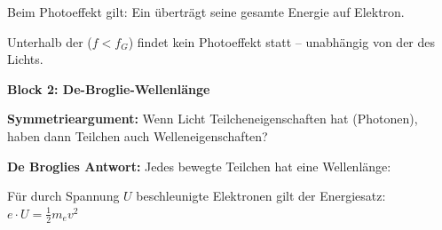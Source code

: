 \documentclass[11pt,a4paper]{article}
\begin{document}

\begin{tcolorbox}[merkbox={Kasten 1: Merksatz Photoeffekt}]
Beim Photoeffekt gilt: Ein \underline{\hspace{2.5cm}} überträgt seine gesamte Energie auf \underline{\hspace{1.5cm}} Elektron.

\vspace{0.3em}
Unterhalb der \underline{\hspace{3cm}} ($f < f_G$) findet kein Photoeffekt statt -- unabhängig von der \underline{\hspace{3cm}} des Lichts.
\end{tcolorbox}

\newpage


{\large\textbf{Block 2: De-Broglie-Wellenlänge}}

\vspace{0.3em}


\begin{tcolorbox}[merkbox={Kasten 2: De-Broglie-Hypothese (1924)}]
\textbf{Symmetrieargument:} Wenn Licht Teilcheneigenschaften hat (Photonen), haben dann Teilchen auch Welleneigenschaften?

\vspace{0.5em}
\textbf{De Broglies Antwort:} Jedes bewegte Teilchen hat eine Wellenlänge:

\begin{center}
\end{center}

\vspace{0.3em}
Für durch Spannung $U$ beschleunigte Elektronen gilt der Energiesatz: $e \cdot U = \frac{1}{2} m_e v^2$
\end{tcolorbox}

\vspace{0.5em}
\end{document}
